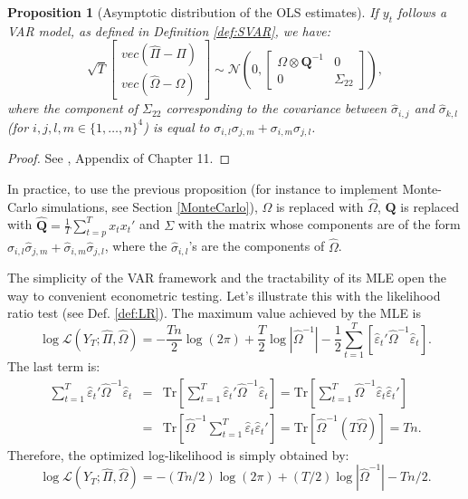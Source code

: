 \documentclass[
  12pt,
]{book}
\newtheorem{proposition}{Proposition}[chapter]
\theoremstyle{definition}
\theoremstyle{definition}
\theoremstyle{definition}
\theoremstyle{definition}
\theoremstyle{remark}
\begin{document}
\begin{proposition}[Asymptotic distribution of the OLS estimates]
\protect\hypertarget{prp:OLSVAR2}{}\label{prp:OLSVAR2}If \(y_t\) follows a VAR model, as defined in Definition \ref{def:SVAR}, we have:
\begin{equation}
\sqrt{T}\left[
\begin{array}{c}
vec(\hat\Pi - \Pi)\\
vec(\hat\Omega - \Omega)
\end{array}
\right]
\sim \mathcal{N}\left(0,
\left[
\begin{array}{cc}
\Omega \otimes \mathbf{Q}^{-1} & 0\\
0 & \Sigma_{22}
\end{array}
\right]\right),\label{eq:asymptPi}
\end{equation}
where the component of \(\Sigma_{22}\) corresponding to the covariance between \(\hat\sigma_{i,j}\) and \(\hat\sigma_{k,l}\) (for \(i,j,l,m \in \{1,\dots,n\}^4\)) is equal to \(\sigma_{i,l}\sigma_{j,m}+\sigma_{i,m}\sigma_{j,l}\).
\end{proposition}

\begin{proof}
See \citet{Hamilton_1994}, Appendix of Chapter 11.
\end{proof}

In practice, to use the previous proposition (for instance to implement Monte-Carlo simulations, see Section \ref{MonteCarlo}), \(\Omega\) is replaced with \(\hat{\Omega}\), \(\mathbf{Q}\) is replaced with \(\hat{\mathbf{Q}} = \frac{1}{T}\sum_{t=p}^T x_t x_t'\) and \(\Sigma\) with the matrix whose components are of the form \(\hat\sigma_{i,l}\hat\sigma_{j,m}+\hat\sigma_{i,m}\hat\sigma_{j,l}\), where the \(\hat\sigma_{i,l}\)'s are the components of \(\hat\Omega\).

The simplicity of the VAR framework and the tractability of its MLE open the way to convenient econometric testing. Let's illustrate this with the likelihood ratio test (see Def. \ref{def:LR}). The maximum value achieved by the MLE is
\[
\log\mathcal{L}(Y_{T};\hat{\Pi},\hat{\Omega}) = -\frac{Tn}{2}\log(2\pi)+\frac{T}{2}\log\left|\hat{\Omega}^{-1}\right| -\frac{1}{2}\sum_{t=1}^{T}\left[\hat{\varepsilon}_{t}'\hat{\Omega}^{-1}\hat{\varepsilon}_{t}\right].
\]
The last term is:
\begin{eqnarray*}
\sum_{t=1}^{T}\hat{\varepsilon}_{t}'\hat{\Omega}^{-1}\hat{\varepsilon}_{t} &=& \mbox{Tr}\left[\sum_{t=1}^{T}\hat{\varepsilon}_{t}'\hat{\Omega}^{-1}\hat{\varepsilon}_{t}\right] = \mbox{Tr}\left[\sum_{t=1}^{T}\hat{\Omega}^{-1}\hat{\varepsilon}_{t}\hat{\varepsilon}_{t}'\right]\\
&=&\mbox{Tr}\left[\hat{\Omega}^{-1}\sum_{t=1}^{T}\hat{\varepsilon}_{t}\hat{\varepsilon}_{t}'\right] = \mbox{Tr}\left[\hat{\Omega}^{-1}\left(T\hat{\Omega}\right)\right]=Tn.
\end{eqnarray*}
Therefore, the optimized log-likelihood is simply obtained by:
\begin{equation}
\log\mathcal{L}(Y_{T};\hat{\Pi},\hat{\Omega})=-(Tn/2)\log(2\pi)+(T/2)\log\left|\hat{\Omega}^{-1}\right|-Tn/2.\label{eq:optimzedLogL}
\end{equation}
\end{document}
